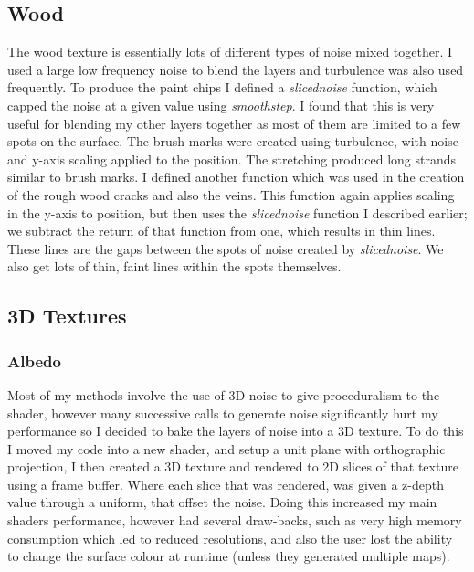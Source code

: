 \documentclass[]{acmsiggraph}
\begin{document}
\subsection{Wood}

The wood texture is essentially lots of different types of noise mixed together. I used a large low frequency noise to blend the layers and turbulence was also used frequently. To produce the paint chips I defined a \textit{slicednoise} function, which capped the noise at a given value using \textit{smoothstep}. I found that this is very useful for blending my other layers together as most of them are limited to a few spots on the surface. The brush marks were created using turbulence, with noise and y-axis scaling applied to the position. The stretching produced long strands similar to brush marks. I defined another function which was used in the creation of the rough wood cracks and also the veins. This function again  applies scaling in the y-axis to position, but then uses the \textit{slicednoise} function I described earlier; we subtract the return of that function from one, which results in thin lines. These lines are the gaps between the spots of noise created by \textit{slicednoise}. We also get lots of thin, faint lines within the spots themselves.

\subsection{3D Textures}

\subsubsection{Albedo}

Most of my methods involve the use of 3D noise to give proceduralism to the shader, however many successive calls to generate noise significantly hurt my performance so I decided to bake the layers of noise into a 3D texture. To do this I moved my code into a new shader, and setup a unit plane with orthographic projection, I then created a 3D texture and rendered to 2D slices of that texture using a frame buffer. Where each slice that was rendered, was given a z-depth value through a uniform, that offset the noise. Doing this increased my main shaders performance, however had several draw-backs, such as very high memory consumption which led to reduced resolutions, and also the user lost the ability to change the surface colour at runtime (unless they generated multiple maps).
\end{document}
